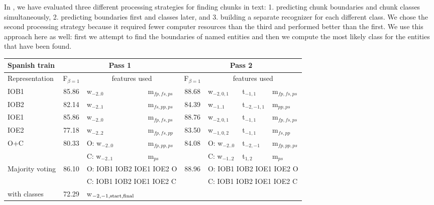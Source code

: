 \documentclass[10pt]{article}
\begin{document}
In \cite{tks2002jmlr}, we have evaluated three different processing
strategies for finding chunks in text: 1. predicting chunk boundaries
and chunk classes simultaneously, 2. predicting boundaries first and
classes later, and 3. building a separate recognizer for each
different class.
We chose the second processing strategy because it required fewer 
computer resources than the third and performed better than the first.
We use this approach here as well: first we attempt to find 
the boundaries of named entities and then we compute the most
likely class for the entities that have been found.

\begin{table*}[t]
\begin{center}
\begin{tabular}{|l|c|ll|c|lll|}\cline{2-8}
\multicolumn{1}{l|}{Spanish train} & \multicolumn{3}{c|}{Pass 1}  
                           & \multicolumn{4}{c|}{Pass 2} \\\hline
Representation& F$_{\beta=1}$ & \multicolumn{2}{c|}{features used} & 
       F$_{\beta=1}$ & \multicolumn{3}{c|}{features used} \\\hline
IOB1 & 85.86 & w$_{-2..0}$                    & m$_{fp,fs,ps}$ 
     & 88.68 & w$_{-2,0,1}$   & t$_{-1,1}$    & m$_{fp,fs,ps}$ \\
IOB2 & 82.14 & w$_{-2..1}$                    & m$_{fs,pp,ps}$
     & 84.39 & w$_{-1..1}$    & t$_{-2,-1,1}$ & m$_{pp,ps}$    \\
IOE1 & 85.86 & w$_{-2..0}$                    & m$_{fp,fs,ps}$
     & 88.76 & w$_{-2,0,1}$   & t$_{-1,1}$    & m$_{fp,fs,ps}$ \\
IOE2 & 77.18 & w$_{-2..2}$                    & m$_{fp,fs,pp}$
     & 83.50 & w$_{-1,0,2}$   & t$_{-1,1}$    & m$_{fs,pp}$    \\
O+C  & 80.33 & O: w$_{-2..0}$                 & m$_{fp,pp,ps}$             
     & 84.08 & O: w$_{-2..0}$ & t$_{-2,-1}$   & m$_{fp,pp,ps}$ \\
     &       & C: w$_{-2..1}$                 & m$_{ps}$
     &       & C: w$_{-1..2}$ & t$_{1,2}$     & m$_{ps}$       \\\hline
Majority voting & 86.10 & \multicolumn{2}{l|}{O: IOB1 IOB2 IOE1 IOE2 O}
                & 88.96 & \multicolumn{3}{l|}{O: IOB1 IOB2 IOE1 IOE2 O} \\
                &       & \multicolumn{2}{l|}{C: IOB1 IOB2 IOE1 IOE2 C}
                &       & \multicolumn{3}{l|}{C: IOB1 IOB2 IOE1 IOE2 C}\\\hline
with classes    & 72.29 & w$_{{\rm -2,-1,start,final}}$ & 

\end{tabular}
\end{center}
\end{table*}
\end{document}
